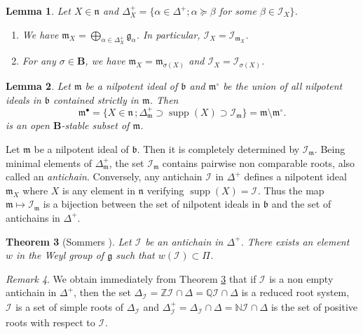 \documentclass{amsart}
\newtheorem{theorem}{Theorem}[section]
\newtheorem{lemma}[theorem]{Lemma}
\theoremstyle{definition}
\theoremstyle{remark}
\newtheorem{remark}[theorem]{Remark}
\numberwithin{equation}{section}
\newcommand{\highlight}[1]{{\it #1}}
\newcommand{\supp}{\mathop{\mathrm{supp}}\nolimits}
\newcommand{\soc}[1]{\mathcal{I}_{#1}}
\newcommand{\group}[1]{\mathbf{#1}}
\begin{document}
\begin{lemma}\label{socle-element}
Let $X\in \mathfrak{n}$ and $\Delta_{X}^{+} 
= \{ \alpha \in \Delta^{+} ; \alpha \succcurlyeq \beta$ for some 
$\beta\in \soc{X} \}$.
\begin{enumerate}
\item We have $\mathfrak{m}_{X} = \bigoplus_{\alpha\in \Delta_{X}^{+}} \mathfrak{g}_{\alpha}$.
In particular, $\soc{X} = \soc{\mathfrak{m}_{X}}$.
\item For any $\sigma \in \group{B}$, we have $\mathfrak{m}_{X} = \mathfrak{m}_{\sigma ( X )}$ and 
$\soc{X}=\soc{\sigma( X )}$.
\end{enumerate}
\end{lemma}

\begin{lemma}\label{socle-ideal}
Let $\mathfrak{m}$ be a nilpotent ideal of $\mathfrak{b}$ and
$\mathfrak{m}^{\circ}$ be the union of all nilpotent ideals in $\mathfrak{b}$ 
contained strictly in $\mathfrak{m}$. Then
$$
\mathfrak{m}^{\bullet} = \{ X\in \mathfrak{n}\, ; \Delta_{\mathfrak{m}}^{+}\supset 
\supp( X) \supset \soc{\mathfrak{m}} \}
= \mathfrak{m} \setminus  \mathfrak{m}^{\circ}.
$$
is an open $\group{B}$-stable subset of $\mathfrak{m}$.
\end{lemma}

Let $\mathfrak{m}$ be a nilpotent ideal of $\mathfrak{b}$. Then it is completely determined
by $\soc{\mathfrak{m}}$. Being minimal elements of $\Delta_{\mathfrak{m}}^{+}$, 
the set $\soc{\mathfrak{m}}$ contains pairwise non comparable roots, also called an
\highlight{antichain}. Conversely, any antichain $\soc{}$ in $\Delta^{+}$ defines 
a nilpotent ideal $\mathfrak{m}_{X}$ where $X$ is any element in $\mathfrak{n}$ 
verifying $\supp (X) = \soc{}$. Thus the map $\mathfrak{m}\mapsto \soc{\mathfrak{m}}$ 
is a bijection between the set of nilpotent ideals in $\mathfrak{b}$ and the set of antichains
in $\Delta^{+}$.  

\begin{theorem}[Sommers \cite{So}]\label{antichain}
Let $\soc{}$ be an antichain in $\Delta^{+}$. There exists an element $w$ in the 
Weyl group of $\mathfrak{g}$ such that $w (\soc{} ) \subset \Pi$.
\end{theorem}

\begin{remark}\label{antichain-remark}
We obtain immediately from Theorem \ref{antichain} that if
$\soc{}$ is a non empty antichain in $\Delta^{+}$, then the set $\Delta_{\soc{}} = \mathbb{Z} \soc{} \cap \Delta =
\mathbb{Q} \soc{} \cap \Delta$ is a reduced root system, $\soc{}$ is a set of simple roots of $\Delta_{\soc{}}$
and $\Delta_{\soc{}}^{+} = \Delta_{\soc{}} \cap \Delta = \mathbb{N} \soc{} \cap \Delta$
is the set of positive roots with respect to $\soc{}$.
\end{remark}
\end{document}
